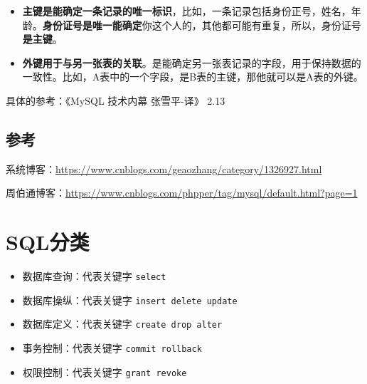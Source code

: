 \documentclass[UTF8,a4paper,12pt]{ctexbook}
\begin{document}
			\begin{itemize}
				\item \textbf{主键是能确定一条记录的唯一标识}，比如，一条记录包括身份正号，姓名，年龄。\textbf{身份证号是唯一能确定}你这个人的，其他都可能有重复，所以，身份证号\textbf{是主键}。
				
				\item \textbf{外键用于与另一张表的关联}。是能确定另一张表记录的字段，用于保持数据的一致性。比如，A表中的一个字段，是B表的主键，那他就可以是A表的外键。
			\end{itemize}
		
			具体的参考：《MySQL 技术内幕 张雪平-译》 2.13
		\subsection{参考}
		
			系统博客：\url{https://www.cnblogs.com/geaozhang/category/1326927.html}
		
			周伯通博客：\url{https://www.cnblogs.com/phpper/tag/mysql/default.html?page=1}
	

	\section{SQL分类}
		\begin{itemize}
			\item 数据库查询：代表关键字 \verb|select|
			\item 数据库操纵：代表关键字 \verb|insert delete update|
			\item 数据库定义：代表关键字 \verb|create drop alter|
			\item 事务控制：代表关键字 \verb|commit rollback|
			\item 权限控制：代表关键字 \verb|grant revoke|
		\end{itemize} 
	
\end{document}
